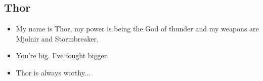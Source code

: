 \documentclass[11pt]{article}
\begin{document}
\begin{center}
    \subsection*{Thor}
        \begin{itemize}
            \item My name is Thor, my power is being the God of thunder and my weapons are Mjolnir and Stormbreaker.
            \item You're big. I've fought bigger.
            \item Thor is always worthy...
        \end{itemize}
\end{center}
\end{document}

